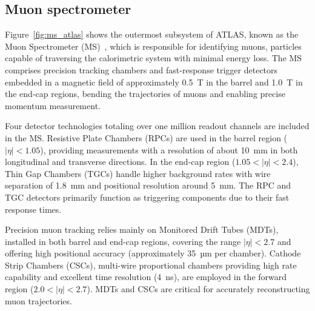 

\subsection{Muon spectrometer}
\label{sec:muon}


Figure~\ref{fig:ms_atlas} shows the outermost subsystem of ATLAS, known as the Muon Spectrometer (MS)~\cite{muon_com}, which is responsible for identifying muons, particles capable of traversing the calorimetric system with minimal energy loss. The MS comprises precision tracking chambers and fast-response trigger detectors embedded in a magnetic field of approximately 0.5~T in the barrel and 1.0~T in the end-cap regions, bending the trajectories of muons and enabling precise momentum measurement.

Four detector technologies totaling over one million readout channels are included in the MS. Resistive Plate Chambers (RPCs) are used in the barrel region ($|\eta| < 1.05$), providing measurements with a resolution of about 10~mm in both longitudinal and transverse directions. In the end-cap region ($1.05 < |\eta| < 2.4$), Thin Gap Chambers (TGCs) handle higher background rates with wire separation of 1.8~mm and positional resolution around 5~mm. The RPC and TGC detectors primarily function as triggering components due to their fast response times.

Precision muon tracking relies mainly on Monitored Drift Tubes (MDTs), installed in both barrel and end-cap regions, covering the range $|\eta| < 2.7$ and offering high positional accuracy (approximately 35~µm per chamber). Cathode Strip Chambers (CSCs), multi-wire proportional chambers providing high rate capability and excellent time resolution (4~ns), are employed in the forward region ($2.0 < |\eta| < 2.7$). MDTs and CSCs are critical for accurately reconstructing muon trajectories.

